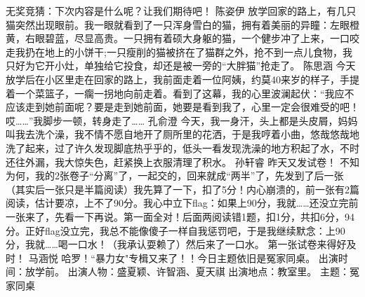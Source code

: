 {}无奖竞猜：下次内容是什么呢？让我们期待吧！\markdownRendererInterblockSeparator
{}\markdownRendererInterblockSeparator
{}陈姿伊\markdownRendererInterblockSeparator
{}放学回家的路上，有几只猫突然出现眼前。我一眼就看到了一只浑身雪白的猫，拥有着美丽的异瞳：左眼橙黄，右眼碧蓝，尽显高贵。一只拥有着硕大身躯的猫，一个健步冲了上来，一口咬走我扔在地上的小饼干;一只瘦削的猫被挤在了猫群之外，抢不到一点儿食物，我只好为它开小灶，单独给它投食，却还是被一旁的“大胖猫”抢走了。 \markdownRendererInterblockSeparator
{}\markdownRendererInterblockSeparator
{}陈思涵\markdownRendererInterblockSeparator
{}今天放学后在小区里走在回家的路上，我前面走着一位阿姨，约莫40来岁的样子，手提着一个菜篮子，一瘸一拐地向前走着。看到了这幕，我的心里波澜起伏：“我应不应该走到她前面呢？要是走到她前面，她要是看到我了，心里一定会很难受的吧！哎……”我脚步一顿，转身走了……\markdownRendererInterblockSeparator
{}\markdownRendererInterblockSeparator
{}孔俞澄\markdownRendererInterblockSeparator
{}今天，我一身汗，头上都是头皮屑，妈妈叫我去洗个澡，我不情不愿自地开了厕所里的花洒，于是我哼着小曲，悠哉悠哉地洗了起来，过了许久发现脚底热乎乎的，低头一看发现洗澡的地方积起了水，不时还往外漏，我大惊失色，赶紧换上衣服清理了积水。\markdownRendererInterblockSeparator
{}\markdownRendererInterblockSeparator
{}孙轩睿\markdownRendererInterblockSeparator
{}昨天又发试卷！\markdownRendererInterblockSeparator
{}不知为何，我的2张卷子“分离”了，一起交的，回来就成“两半”了，先发到了后一张（其实后一张只是半篇阅读）我先算了一下，扣了5分！内心崩溃的，前一张有2篇阅读，估计要凉，上不了90分。我心中立下flag：如果上90分，我就……还没立完前一张来了，先看一下再说。第一面全对！后面两阅读错1题，扣1分，共扣6分，94分。正好flag没立完，我总不能像傻子一样自我惩罚吧，于是我继续默念：上90分，我就……喝一口水！（我承认耍赖了）然后来了一口水。\markdownRendererInterblockSeparator
{}第一张试卷来得好及时！\markdownRendererInterblockSeparator
{}\markdownRendererInterblockSeparator
{}马涵悦\markdownRendererInterblockSeparator
{}哈罗！“暴力女"专楫又来了！！今日主题依旧是冤家同桌。\markdownRendererInterblockSeparator
{}出演时间：放学前。 出演人物：盛夏颖、许智涵、夏天祺 \markdownRendererInterblockSeparator
{}出演地点：教室里。 主题：冤家同桌 \markdownRendererInterblockSeparator
